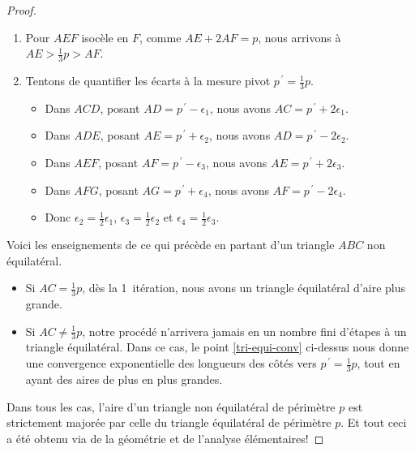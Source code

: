 \begin{proof}
\begin{enumerate}
        \item Pour $AEF$ isocèle en $F$, comme $AE + 2AF = p$, nous arrivons à  $AE > \frac13 p > AF$.


        \item \label{tri-equi-conv}
        Tentons de quantifier les écarts à la mesure pivot $p^{\,\prime} = \frac13 p$.
        \begin{itemize}
            \item Dans $ACD$, posant $AD = p^{\,\prime} - \epsilon_1$, nous avons $AC = p^{\,\prime} + 2 \epsilon_1$.

            \item Dans $ADE$, posant $AE = p^{\,\prime} + \epsilon_2$, nous avons $AD = p^{\,\prime} - 2 \epsilon_2$.

            \item Dans $AEF$, posant $AF = p^{\,\prime} - \epsilon_3$, nous avons $AE = p^{\,\prime} + 2 \epsilon_3$.

            \item Dans $AFG$, posant $AG = p^{\,\prime} + \epsilon_4$, nous avons $AF = p^{\,\prime} - 2 \epsilon_4$.

            \item Donc
            $\epsilon_2 = \frac12 \epsilon_1$,
            $\epsilon_3 = \frac12 \epsilon_2$
            et
            $\epsilon_4 = \frac12 \epsilon_3$.
        \end{itemize}
    \end{enumerate}


    \smallskip

    Voici les enseignements de ce qui précède en partant d'un triangle $ABC$ non équilatéral.
    \begin{itemize}
        \item Si $AC = \frac13p$, dès la 1\iere\ itération, nous avons un triangle équilatéral d'aire plus grande.


        \item Si $AC \neq \frac13p$, notre procédé n'arrivera jamais en un nombre fini d'étapes à un triangle équilatéral.
        Dans ce cas, le point \ref{tri-equi-conv} ci-dessus nous donne une convergence exponentielle des longueurs des côtés vers $p^{\,\prime} = \frac13 p$, tout en ayant des aires de plus en plus grandes.
    \end{itemize}

    Dans tous les cas, l'aire d'un triangle non équilatéral de périmètre $p$ est strictement majorée par celle du triangle équilatéral de périmètre $p$. Et tout ceci a été obtenu via de la géométrie et de l'analyse élémentaires!
\end{proof}
